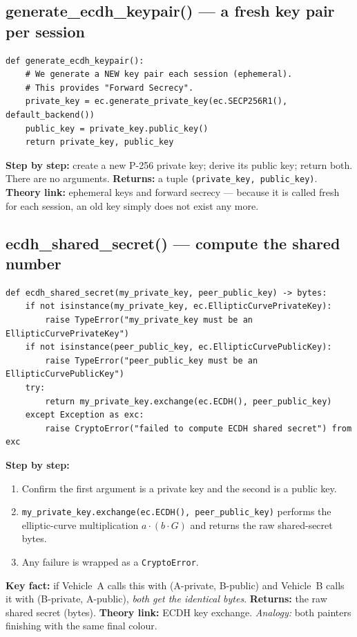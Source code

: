 \documentclass[11pt,a4paper]{report}
\begin{document}
\subsection{generate\_ecdh\_keypair() --- a fresh key pair per session}
\begin{lstlisting}[style=py,caption={crypto.py --- generate an ephemeral ECDH key pair.}]
def generate_ecdh_keypair():
    # We generate a NEW key pair each session (ephemeral).
    # This provides "Forward Secrecy".
    private_key = ec.generate_private_key(ec.SECP256R1(), default_backend())
    public_key = private_key.public_key()
    return private_key, public_key
\end{lstlisting}
\textbf{Step by step:} create a new P-256 private key; derive its public key;
return both. There are no arguments. \textbf{Returns:} a tuple
\texttt{(private\_key, public\_key)}. \textbf{Theory link:} ephemeral keys and
forward secrecy --- because it is called fresh for each session, an old key
simply does not exist any more.

\subsection{ecdh\_shared\_secret() --- compute the shared number}
\begin{lstlisting}[style=py,caption={crypto.py --- ECDH shared-secret computation.}]
def ecdh_shared_secret(my_private_key, peer_public_key) -> bytes:
    if not isinstance(my_private_key, ec.EllipticCurvePrivateKey):
        raise TypeError("my_private_key must be an EllipticCurvePrivateKey")
    if not isinstance(peer_public_key, ec.EllipticCurvePublicKey):
        raise TypeError("peer_public_key must be an EllipticCurvePublicKey")
    try:
        return my_private_key.exchange(ec.ECDH(), peer_public_key)
    except Exception as exc:
        raise CryptoError("failed to compute ECDH shared secret") from exc
\end{lstlisting}
\textbf{Step by step:}
\begin{enumerate}
  \item Confirm the first argument is a private key and the second is a public key.
  \item \texttt{my\_private\_key.exchange(ec.ECDH(), peer\_public\_key)} performs
        the elliptic-curve multiplication $a\cdot(b\cdot G)$ and returns the raw
        shared-secret bytes.
  \item Any failure is wrapped as a \texttt{CryptoError}.
\end{enumerate}
\textbf{Key fact:} if Vehicle~A calls this with (A-private, B-public) and
Vehicle~B calls it with (B-private, A-public), \emph{both get the identical
bytes}. \textbf{Returns:} the raw shared secret (bytes). \textbf{Theory link:}
ECDH key exchange. \emph{Analogy:} both painters finishing with the same final
colour.
\end{document}
